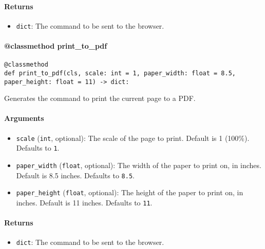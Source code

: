 \documentclass{article}
\begin{document}
\paragraph{Returns}

\begin{itemize}
    \item \lstinline[style=pythonstyle]|dict|: The command to be sent to the browser.
\end{itemize}

\paragraph{@classmethod print\_to\_pdf}

\begin{lstlisting}[style=pythonstyle]
@classmethod
def print_to_pdf(cls, scale: int = 1, paper_width: float = 8.5, paper_height: float = 11) -> dict:
\end{lstlisting}

\noindent Generates the command to print the current page to a PDF.

\paragraph{Arguments}

\begin{itemize}
    \item \lstinline[style=pythonstyle]|scale| (\lstinline[style=pythonstyle]|int|, optional): The scale of the page to print. Default is 1 (100\%). Defaults to \lstinline[style=pythonstyle]|1|.
    \item \lstinline[style=pythonstyle]|paper_width| (\lstinline[style=pythonstyle]|float|, optional): The width of the paper to print on, in inches. Default is 8.5 inches. Defaults to \lstinline[style=pythonstyle]|8.5|.
    \item \lstinline[style=pythonstyle]|paper_height| (\lstinline[style=pythonstyle]|float|, optional): The height of the paper to print on, in inches. Default is 11 inches. Defaults to \lstinline[style=pythonstyle]|11|.
\end{itemize}

\paragraph{Returns}

\begin{itemize}
    \item \lstinline[style=pythonstyle]|dict|: The command to be sent to the browser.
\end{itemize}
\end{document}
